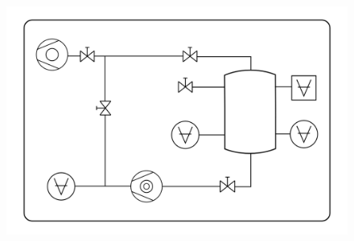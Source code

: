 \documentclass[a4paper,11pt]{article}
\begin{document}
\vspace{-10 pt} 
 \begin{center} 
\begin{figure}[htpd]
\hspace{20 pt}
\includegraphics[scale=0.4]{schema_finale.png}
\end{figure}
\end{center}
\end{document}
